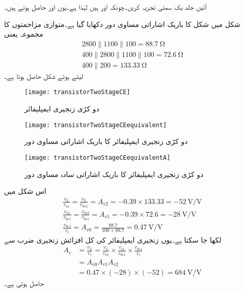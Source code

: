 آئیں جلد یک سمتی تجزیہ کریں۔چونکہ  اور  ہیں لہٰذا  ہے۔یوں  اور   حاصل ہوتے ہیں۔

شکل  میں شکل  کا باریک اشاراتی مساوی دور دکھایا گیا ہے۔متوازی مزاحمتوں کا مجموعہ یعنی
\begin{align*}
2800 \mathbin{\|} 1100 \mathbin{\|} 100=\SI{88.7}{\ohm}\\
400 \mathbin{\|} 2800 \mathbin{\|} 1100 \mathbin{\|} 100=\SI{72.6}{\ohm}\\
400 \mathbin{\|} 200 =\SI{133.33}{\ohm}
\end{align*}
لیتے ہوئے شکل  حاصل ہوتا ہے۔

\begin{figure}
\centering
\texttt{[image: transistorTwoStageCE]}
\caption{دو کڑی زنجیری ایمپلیفائر}
\label{شکل_دو_کڑی_زنجیری_ایمپلیفائر}
\end{figure}
%
\begin{figure}
\centering
\texttt{[image: transistorTwoStageCEequivalent]}
\caption{دو کڑی زنجیری ایمپلیفائر کا باریک اشاراتی مساوی دور}
\label{شکل_دو_کڑی_زنجیری_ایمپلیفائر_مساوی_الف}
\end{figure}
%
\begin{figure}
\centering
\texttt{[image: transistorTwoStageCEequivalentA]}
\caption{دو کڑی زنجیری ایمپلیفائر کا باریک اشاراتی سادہ مساوی دور}
\label{شکل_دو_کڑی_زنجیری_ایمپلیفائر_سادہ_مساوی_الف}
\end{figure}

اس شکل میں
\begin{align*}
\frac{v_L}{v_{o1}}=\frac{v_L}{v_{be2}}=A_{v2}=-0.39 \times 133.33=\SI[per=frac,fraction=nice]{-52}{\volt \per \volt}\\
\frac{v_{o1}}{v_{be1}}=\frac{v_{be2}}{v_{be1}}=A_{v1}=-0.39 \times 72.6=\SI[per=frac,fraction=nice]{-28}{\volt \per \volt}\\
\frac{v_{be1}}{v_i}=A_{v0}=\frac{88.7}{100+88.7}=\SI[per=frac,fraction=nice]{0.47}{\volt \per \volt}
\end{align*}
لکھا جا سکتا ہے۔یوں زنجیری ایمپلیفائر کی کل افزائش زنجیری ضرب سے
\begin{align*}
A_v&=\frac{v_L}{v_i}=\frac{v_L}{v_{o1}} \times \frac{v_{o1}}{v_{be1}} \times \frac{v_{be1}}{v_i}\\
&=A_{v0} A_{v1} A_{v2}\\
&=0.47 \times \left(-28 \right) \times \left(-52 \right)=\SI[per=frac,fraction=nice]{684}{\volt \per \volt}
\end{align*}
حاصل ہوتی ہے۔

